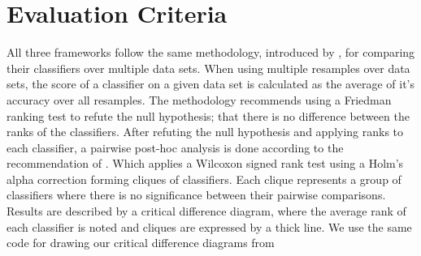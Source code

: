 \section{Evaluation Criteria}
\label{ReviewsEvaluation}
All three frameworks follow the same methodology, introduced by \cite{demvsar2006statistical}, for comparing their classifiers over multiple data sets.
When using multiple resamples over data sets, the score of a classifier on a given data set is calculated as the average of it's accuracy over all resamples.
The methodology recommends using a Friedman ranking test to refute the null hypothesis; that there is no difference between the ranks of the classifiers.
After refuting the null hypothesis and applying ranks to each classifier, a pairwise post-hoc analysis is done according to the recommendation of \cite{benavoli2016should}.
Which applies a Wilcoxon signed rank test using a Holm's alpha correction forming cliques of classifiers. Each clique represents a group of classifiers where there is no
significance between their pairwise comparisons. Results are described by a critical difference diagram, where the average rank of each classifier is noted
and cliques are expressed by a thick line.
We use the same code for drawing our critical difference diagrams from \cite{fawaz2019deepreview}